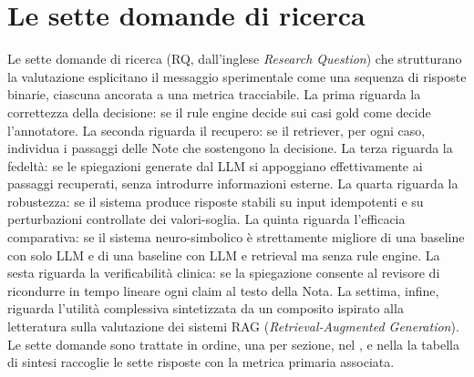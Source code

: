 \section{Le sette domande di ricerca}
\label{sec:rq}

Le sette domande di ricerca (RQ, dall'inglese \emph{Research Question}) che strutturano la valutazione esplicitano il messaggio sperimentale come una sequenza di risposte binarie, ciascuna ancorata a una metrica tracciabile. La prima riguarda la correttezza della decisione: se il rule engine decide sui casi gold come decide l'annotatore. La seconda riguarda il recupero: se il retriever, per ogni caso, individua i passaggi delle Note che sostengono la decisione. La terza riguarda la fedeltà: se le spiegazioni generate dal LLM si appoggiano effettivamente ai passaggi recuperati, senza introdurre informazioni esterne. La quarta riguarda la robustezza: se il sistema produce risposte stabili su input idempotenti e su perturbazioni controllate dei valori-soglia. La quinta riguarda l'efficacia comparativa: se il sistema neuro-simbolico è strettamente migliore di una baseline con solo LLM e di una baseline con LLM e retrieval ma senza rule engine. La sesta riguarda la verificabilità clinica: se la spiegazione consente al revisore di ricondurre in tempo lineare ogni claim al testo della Nota. La settima, infine, riguarda l'utilità complessiva sintetizzata da un composito ispirato alla letteratura sulla valutazione dei sistemi RAG (\emph{Retrieval-Augmented Generation}). Le sette domande sono trattate in ordine, una per sezione, nel , e nella  la tabella di sintesi raccoglie le sette risposte con la metrica primaria associata.

